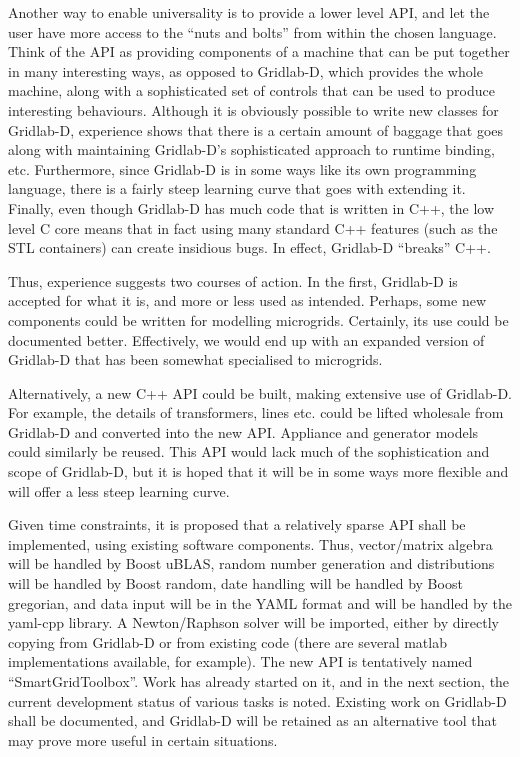 \documentclass[12pt]{article}
\begin{document}
Another way to enable universality is to provide a lower level API, and let the user have more access to the ``nuts and bolts'' from within the chosen language. Think of the API as providing components of a machine that can be put together in many interesting ways, as opposed to Gridlab-D, which provides the whole machine, along with a sophisticated set of controls that can be used to produce interesting behaviours. Although it is obviously possible to write new classes for Gridlab-D, experience shows that there is a certain amount of baggage that goes along with maintaining Gridlab-D's sophisticated approach to runtime binding, etc. Furthermore, since Gridlab-D is in some ways like its own programming language, there is a fairly steep learning curve that goes with extending it. Finally, even though Gridlab-D has much code that is written in C++, the low level C core means that in fact using many standard C++ features (such as the STL containers) can create insidious bugs. In effect, Gridlab-D ``breaks'' C++.

Thus, experience suggests two courses of action. In the first, Gridlab-D is accepted for what it is, and more or less used as intended. Perhaps, some new components could be written for modelling microgrids. Certainly, its use could be documented better. Effectively, we would end up with an expanded version of Gridlab-D that has been somewhat specialised to microgrids.

Alternatively, a new C++ API could be built, making extensive use of Gridlab-D. For example, the details of transformers, lines etc. could be lifted wholesale from Gridlab-D and converted into the new API. Appliance and generator models could similarly be reused. This API would lack much of the sophistication and scope of Gridlab-D, but it is hoped that it will be in some ways more flexible and will offer a less steep learning curve.

Given time constraints, it is proposed that a relatively sparse API shall be implemented, using existing software components. Thus, vector/matrix algebra will be handled by Boost uBLAS, random number generation and distributions will be handled by Boost random, date handling will be handled by Boost gregorian, and data input will be in the YAML format and will be handled by the yaml-cpp library.  A Newton/Raphson solver will be imported, either by directly copying from Gridlab-D or from existing code (there are several matlab implementations available, for example). The new API is tentatively named ``SmartGridToolbox''. Work has already started on it, and in the next section, the current development status of various tasks is noted. Existing work on Gridlab-D shall be documented, and Gridlab-D will be retained as an alternative tool that may prove more useful in certain situations.
\end{document}
